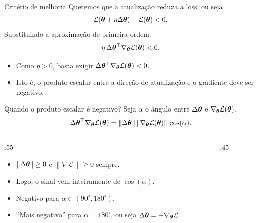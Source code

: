 \documentclass[aspectratio=169,xcolor=dvipsnames]{beamer}
\begin{document}
  \begin{frame}{Critério de melhoria}
    Queremos que a atualização reduza a loss, ou seja
    \[
      \mathcal{L}(\bm{\theta}+\eta \Delta\bm{\theta}) - \mathcal{L}(\bm{\theta}) < 0.
    \]
    Substituindo a aproximação de primeira ordem:
    \[
      \eta\,\Delta\bm{\theta}^\top\nabla_{\bm{\theta}}\mathcal{L}(\bm{\theta}) < 0.
    \]
    \vfill
    \begin{itemize}
      \item Como $\eta>0$, basta exigir $\Delta\bm{\theta}^\top\nabla_{\bm{\theta}}\mathcal{L}(\bm{\theta}) < 0$.
      \item Isto é, o produto escalar entre a direção de atualização e o gradiente
        deve ser \alert{negativo}.
    \end{itemize}
  \end{frame}

  \begin{frame}{Quando o produto escalar é negativo?}
    Seja $\alpha$ o ângulo entre $\Delta\bm{\theta}$ e $\nabla_{\bm{\theta}}\mathcal{L}(\bm{\theta})$.
    \[
      \Delta\bm{\theta}^\top\nabla_{\bm{\theta}}\mathcal{L}(\bm{\theta}) =
        \|\Delta\bm{\theta}\|\,\|\nabla_{\bm{\theta}}\mathcal{L}(\bm{\theta})\|\,\cos(\alpha).
    \]
    \vfill
    \begin{columns}
      \begin{column}{.55\linewidth}
        \begin{itemize}
          \item $\|\Delta\bm{\theta}\|\ge 0$ e $\|\nabla\mathcal{L}\|\ge 0$ sempre.
          \item Logo, o sinal vem inteiramente de $\cos(\alpha)$.
          \item Negativo para $\alpha\in(90^{\circ},180^{\circ})$.
          \item \alert{``Mais negativo''} para $\alpha=180^{\circ}$, ou seja
            $\Delta\bm{\theta}=-\nabla_{\bm{\theta}}\mathcal{L}$.
        \end{itemize}
      \end{column}
      \begin{column}{.45\linewidth}
        \centering
      \end{column}
    \end{columns}
  \end{frame}
\end{document}
